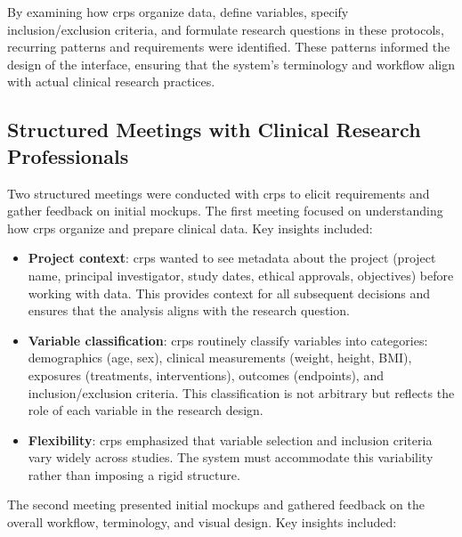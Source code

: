 By examining how \glspl{crp} organize data, define variables, specify inclusion/exclusion criteria, and formulate research questions in these protocols, recurring patterns and requirements were identified. These patterns informed the design of the interface, ensuring that the system's terminology and workflow align with actual clinical research practices.  
  
\subsection{Structured Meetings with Clinical Research Professionals}  
\label{subsec:crp_meetings}  
  
Two structured meetings were conducted with \glspl{crp} to elicit requirements and gather feedback on initial mockups. The first meeting focused on understanding how \glspl{crp} organize and prepare clinical data. Key insights included:  
  
\begin{itemize}  
    \item \textbf{Project context}: \glspl{crp} wanted to see metadata about the project (project name, principal investigator, study dates, ethical approvals, objectives) before working with data. This provides context for all subsequent decisions and ensures that the analysis aligns with the research question.  
      
    \item \textbf{Variable classification}: \glspl{crp} routinely classify variables into categories: demographics (age, sex), clinical measurements (weight, height, BMI), exposures (treatments, interventions), outcomes (endpoints), and inclusion/exclusion criteria. This classification is not arbitrary but reflects the role of each variable in the research design.  
      
    \item \textbf{Flexibility}: \glspl{crp} emphasized that variable selection and inclusion criteria vary widely across studies. The system must accommodate this variability rather than imposing a rigid structure.  
\end{itemize}  
  
The second meeting presented initial mockups and gathered feedback on the overall workflow, terminology, and visual design. Key insights included:  
  
